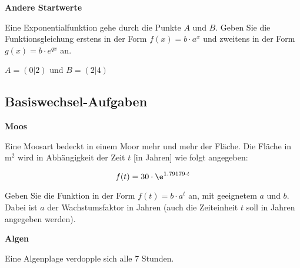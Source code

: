 \platzFuerBerechnungenBisEndeSeite{}



\bbwActAufgabenNr{} \textbf{Andere Startwerte}

Eine Exponentialfunktion gehe durch die Punkte $A$ und $B$. Geben Sie
die Funktionsgleichung erstens in der Form $f(x)=b\cdot{} a^x$ und
zweitens in der Form $g(x)=b\cdot{} e^{qx}$ an.

\begin{bbwAufgabenBlock}
\item $A=(0|2)$ und $B=(2|4)$
\end{bbwAufgabenBlock}


\platzFuerBerechnungenBisEndeSeite{}




\subsection{Basiswechsel-Aufgaben}


\bbwActAufgabenNr{} \textbf{Moos}

Eine Moosart bedeckt in einem Moor mehr und mehr der Fläche. Die
Fläche in $\text{m}^2$ wird in Abhängigkeit der Zeit $t$ [in Jahren]
wie folgt angegeben:

$$f(t) = 30\cdot{}\e^{1.79179\cdot{}t} $$

\begin{bbwAufgabenBlock}

\item Geben Sie die Funktion in der Form $f(t) = b\cdot{}a^t$ an, mit
  geeignetem $a$ und $b$. Dabei ist $a$ der Wachstumsfaktor in Jahren
  (auch die Zeiteinheit $t$ soll in Jahren angegeben werden).

\end{bbwAufgabenBlock}
\TNTeop{}

\newpage

\bbwActAufgabenNr{} \textbf{Algen}

Eine Algenplage verdopple sich alle 7 Stunden.

